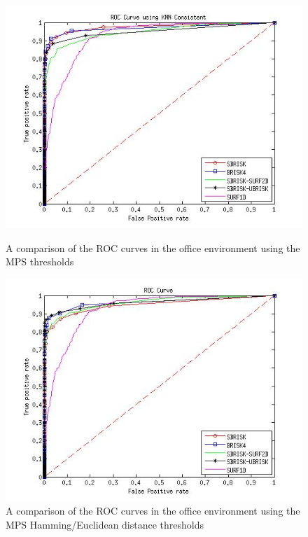 \documentclass[11pt]{report}
\begin{document}
\begin{figure}[h!]
\begin{minipage}[b]{0.5\linewidth}
\includegraphics[scale=0.4]{../Drawings/dataset2_ROC_General_KNN.jpg}
\caption{A comparison of the ROC curves in the office environment using the MPS thresholds}
\label{fig:compareKnnOffice}
\end{minipage}
\hspace{0.5cm}
\begin{minipage}[b]{0.5\linewidth}
\includegraphics[scale=0.4]{../Drawings/dataset2_ROC_General_Hamming.jpg}
\caption{A comparison of the ROC curves in the office environment using the MPS Hamming/Euclidean distance thresholds}
\label{fig:compareHammingOffice}
\end{minipage}

\end{figure}
\end{document}
